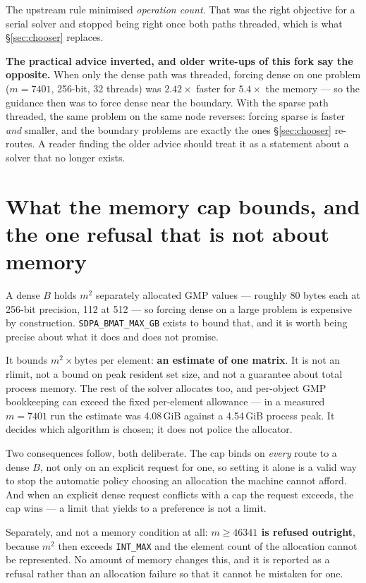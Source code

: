 \documentclass[11pt]{article}
\newcommand{\bMat}{B}
\newcommand{\code}[1]{\texttt{#1}}
\begin{document}
The upstream rule minimised \emph{operation count}. That was the right objective for a serial
solver and stopped being right once both paths threaded, which is what \S\ref{sec:chooser}
replaces.

\textbf{The practical advice inverted, and older write-ups of this fork say the opposite.} When
only the dense path was threaded, forcing dense on one problem ($m = 7401$, 256-bit, 32 threads)
was $2.42\times$ faster for $5.4\times$ the memory --- so the guidance then was to force dense
near the boundary. With the sparse path threaded, the same problem on the same node reverses:
forcing sparse is faster \emph{and} smaller, and the boundary problems are exactly the ones
\S\ref{sec:chooser} re-routes. A reader finding the older advice should treat it as a statement
about a solver that no longer exists.

\section{What the memory cap bounds, and the one refusal that is not about memory}
\label{sec:memory}

A dense $\bMat$ holds $m^2$ separately allocated GMP values --- roughly 80 bytes each at 256-bit
precision, 112 at 512 --- so forcing dense on a large problem is expensive by construction.
\code{SDPA\_BMAT\_MAX\_GB} exists to bound that, and it is worth being precise about what it does
and does not promise.

It bounds $m^2 \times \text{bytes per element}$: \textbf{an estimate of one matrix}. It is not an
rlimit, not a bound on peak resident set size, and not a guarantee about total process memory. The
rest of the solver allocates too, and per-object GMP bookkeeping can exceed the fixed per-element
allowance --- in a measured $m = 7401$ run the estimate was 4.08\,GiB against a 4.54\,GiB process
peak. It decides which algorithm is chosen; it does not police the allocator.

Two consequences follow, both deliberate. The cap binds on \emph{every} route to a dense $\bMat$,
not only on an explicit request for one, so setting it alone is a valid way to stop the automatic
policy choosing an allocation the machine cannot afford. And when an explicit dense request
conflicts with a cap the request exceeds, the cap wins --- a limit that yields to a preference is
not a limit.

Separately, and not a memory condition at all: \textbf{$m \ge 46341$ is refused outright}, because
$m^2$ then exceeds \code{INT\_MAX} and the element count of the allocation cannot be represented.
No amount of memory changes this, and it is reported as a refusal rather than an allocation
failure so that it cannot be mistaken for one.
\end{document}

